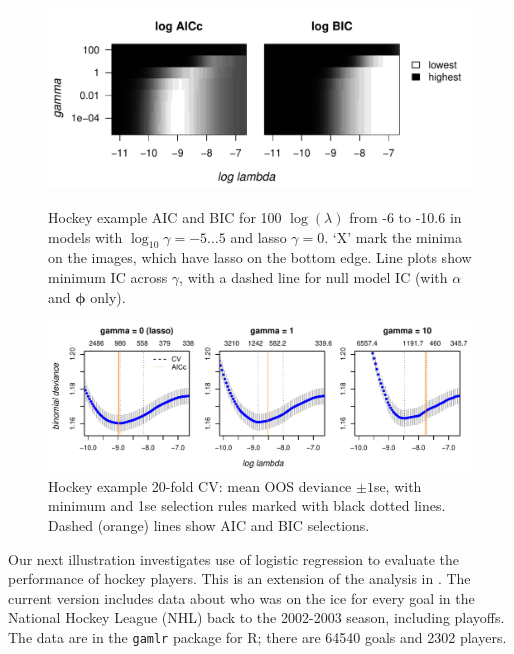 \documentclass[12pt]{article}
\newcommand{\bs}[1]{\boldsymbol{#1}}
\begin{document}
\begin{figure}[htf]
\begin{center}
\includegraphics[width=6in]{../graphs/nhl_ic}
\caption{ \label{nhlic} Hockey example AIC and BIC for 
 100 $\log(\lambda)$ from -6 to -10.6 in models with  
 $\log_{10}\gamma = -5 \ldots 5$ and lasso $\gamma=0$.  `X' mark the 
 minima on the images, which have lasso on the bottom edge. Line plots show minimum IC across $\gamma$, with a dashed line for null model IC (with $\alpha$ and $\bs{\phi}$ only).
}
\end{center}
\includegraphics[width=6.4in]{../graphs/nhl_cv}
\caption{\label{nhlcv} Hockey example 20-fold CV: mean OOS deviance $\pm 1$se, with minimum and 1se selection rules marked with black dotted lines.  
Dashed (orange) lines show AIC and BIC selections. }
\end{figure}


Our next illustration investigates use of logistic regression to evaluate the
performance of hockey players.  This is an extension of the analysis in
\cite{gramacy_estimating_2013}.  The current version includes data about who
was on the ice for every goal in the National Hockey League (NHL) back to the
2002-2003 season, including playoffs.  The data
are in the {\tt gamlr} package for {\sf R}; there are
64540 goals and 2302 players.
\end{document}
